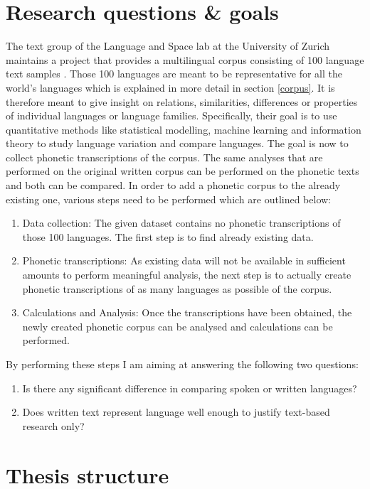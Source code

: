 \section{Research questions \& goals}
The text group of the Language and Space lab at the University of Zurich maintains a project that provides a multilingual corpus consisting of 100 language text samples \citep{UniversityofZurich.19.07.2021}. Those 100 languages are meant to be representative for all the world's languages which is explained in more detail in section \ref{corpus}. It is therefore meant to give insight on relations, similarities, differences or properties of individual languages or language families. Specifically, their goal is to use quantitative methods like statistical modelling, machine learning and information theory to study language variation and compare languages. The goal is now to collect phonetic transcriptions of the corpus. The same analyses that are performed on the original written corpus can be performed on the phonetic texts and both can be compared. In order to add a phonetic corpus to the already existing one, various steps need to be performed which are outlined below:
\begin{enumerate}
 \item Data collection: The given dataset contains no phonetic transcriptions of those 100 languages. The first step is to find already existing data. 
 \item Phonetic transcriptions: As existing data will not be available in sufficient amounts to perform meaningful analysis, the next step is to actually create phonetic transcriptions of as many languages as possible of the corpus. 
 \item Calculations and Analysis: Once the transcriptions have been obtained, the newly created phonetic corpus can be analysed and calculations can be performed.
\end{enumerate}

By performing these steps I am aiming at answering the following two questions:

\begin{enumerate}
\item Is there any significant difference in comparing spoken or written languages?
\item Does written text represent language well enough to justify text-based research only?
\end{enumerate}

\section{Thesis structure}

